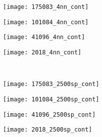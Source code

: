 \begin{figure}[!ht]
    \begin{subfigure}[t]{\textwidth+20pt\relax}
    	\centering
    	\texttt{[image: 175083\_4nn\_cont]} 
    \end{subfigure}      
    \begin{subfigure}[b]{0.23\textwidth}
    	\centering
        \texttt{[image: 101084\_4nn\_cont]}
    \end{subfigure}
    \begin{subfigure}[b]{0.23\textwidth}
    	\centering
        \texttt{[image: 41096\_4nn\_cont]}
    \end{subfigure}
    \begin{subfigure}[b]{0.23\textwidth}
    	\centering
        \texttt{[image: 2018\_4nn\_cont]}
    \end{subfigure} \\ \vspace{-5pt} 
    
    \begin{subfigure}[t]{\textwidth+20pt\relax}
    	\centering
    	\texttt{[image: 175083\_2500sp\_cont]} 
    \end{subfigure}      
    \begin{subfigure}[b]{0.23\textwidth}
    	\centering
        \texttt{[image: 101084\_2500sp\_cont]}
    \end{subfigure}
    \begin{subfigure}[b]{0.23\textwidth}
    	\centering
        \texttt{[image: 41096\_2500sp\_cont]}
    \end{subfigure}
    \begin{subfigure}[b]{0.23\textwidth}
    	\centering
        \texttt{[image: 2018\_2500sp\_cont]}
    \end{subfigure}   
    

\end{figure}
